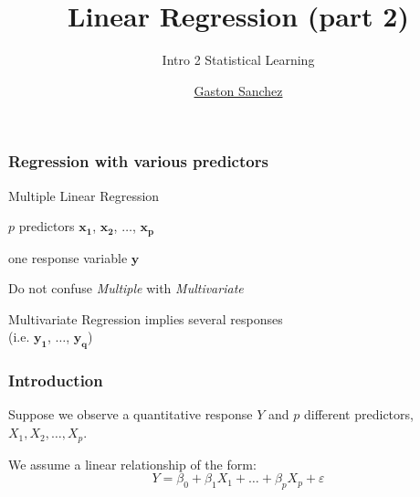 \documentclass[12pt]{beamer}\usepackage[]{graphicx}\usepackage[]{color}
\title{Linear Regression (part 2)}
\subtitle{Intro 2 Statistical Learning}
\author{\href{http://www.gastonsanchez.com}{Gaston Sanchez}}
\institute{\href{https://creativecommons.org/licenses/by-sa/4.0/}{\tt \scriptsize \color{foreground} CC BY-SA 4.0}}
\date{}
\begin{document}
{
  \frame{\titlepage} 
}


\begin{frame}
\begin{center}
\Huge{}
\end{center}
\end{frame}


\begin{frame}
\frametitle{Regression with various predictors}

\bbi
  \item Multiple Linear Regression
  \item $p$ predictors $\mathbf{x_1}$, $\mathbf{x_2}$, $\dots$, $\mathbf{x_p}$
  \item one response variable $\mathbf{y}$
  \item Do not confuse \textit{Multiple} with \textit{Multivariate}
  \item Multivariate Regression implies several responses \\
  (i.e. $\mathbf{y_1}$, $\dots$, $\mathbf{y_q}$)
\ei

\end{frame}


\begin{frame}
\frametitle{Introduction}

Suppose we observe a quantitative response $Y$ and $p$ different predictors, 
$X_1, X_2, \dots, X_p$. 

\bigskip
We assume a linear relationship of the form:
{\large
$$
Y = \beta_0 + \beta_1 X_1 + \dots + \beta_p X_p + \varepsilon
$$
}

\end{frame}

\end{document}
